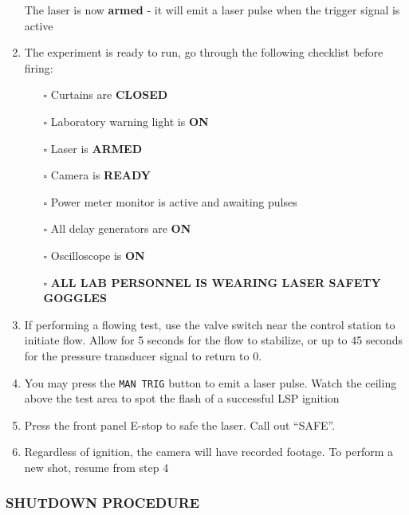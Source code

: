 \begin{enumerate}

  \warningsymbol The laser is now \textbf{armed} - it will emit a laser pulse when
  the trigger signal is active
\item
  The experiment is ready to run, go through the following checklist
  before firing:

  \begin{itemize}
  
  \item[$\square$]
    Curtains are \textbf{CLOSED}
  \item[$\square$]
    Laboratory warning light is \textbf{ON}
  \item[$\square$]
    Laser is \textbf{ARMED}
  \item[$\square$]
    Camera is \textbf{READY}
  \item[$\square$]
    Power meter monitor is active and awaiting pulses
  \item[$\square$]
    All delay generators are \textbf{ON}
  \item[$\square$]
    Oscilloscope is \textbf{ON}
  \item[$\square$]
    \textbf{ALL LAB PERSONNEL IS WEARING LASER
    SAFETY GOGGLES}
  \end{itemize}
\item
  If performing a flowing test, use the valve switch near the control
  station to initiate flow. Allow for 5 seconds for the flow to
  stabilize, or up to 45 seconds for the pressure transducer signal to
  return to 0.
\item
  You may press the \texttt{MAN\ TRIG} button to emit a laser pulse.
  Watch the ceiling above the test area to spot the flash of a
  successful LSP ignition
\item
  Press the front panel E-stop to safe the laser. Call out ``SAFE''.
\item
  Regardless of ignition, the camera will have recorded footage. To
  perform a new shot, resume from step 4
\end{enumerate}


\subsubsection{SHUTDOWN PROCEDURE}\label{shutdown-procedure}

